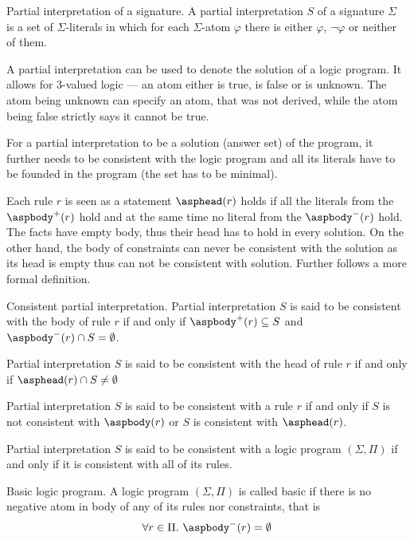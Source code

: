 \begin{definition}{Partial interpretation of a signature.}
    A partial interpretation $S$ of a signature $\Sigma$ is a set
    of $\Sigma$-literals in which for each $\Sigma$-atom $\varphi$
    there is either $\varphi$, $\neg\varphi$ or neither of them.
\end{definition}


A partial interpretation can be used to denote the solution of a logic program.
It allows for 3-valued logic --- an atom either is true, is false or is unknown.
The atom being unknown can specify an atom, that was not derived,
while the atom being false strictly says it cannot be true.

For a partial interpretation to be a solution (answer set) of the program,
it further needs to be consistent with the logic program
and all its literals have to be founded in the program (the set has to be minimal).

Each rule $r$ is seen as a statement $\asphead(r)$ holds
if all the literals from the $\aspbody^+(r)$ hold
and at the same time no literal from the $\aspbody^-(r)$ hold.
The facts have empty body, thus their head has to hold in every solution.
On the other hand, the body of constraints can never be consistent with
the solution as its head is empty thus can not be consistent with solution.
Further follows a more formal definition.

\begin{definition}{Consistent partial interpretation.}\label{consistent_interpretation}
    Partial interpretation $S$ is said to be consistent with the body of rule $r$
    if and only if $\aspbody^+(r) \subseteq S$ and
    $\aspbody^-(r) \cap S = \emptyset$.

    Partial interpretation $S$ is said to be consistent with the head of rule $r$
    if and only if $\asphead(r) \cap S \neq \emptyset$

    Partial interpretation $S$ is said to be consistent with a rule $r$
    if and only if $S$ is not consistent with $\aspbody(r)$
    or $S$ is consistent with $\asphead(r)$.

    Partial interpretation $S$ is said to be consistent with a logic program
    $(\Sigma, \Pi)$ if and only if it is consistent with all of its rules.
\end{definition}

\begin{definition}{Basic logic program.}%
    \label{def:basic_logic_program}
    A logic program $(\Sigma, \Pi)$ is called basic if there is no negative atom
    in body of any of its rules nor constraints, that is
    \begin{equation*}
        \forall r\in \Pi.\ \aspbody^{-}(r) = \emptyset
    \end{equation*}
\end{definition}

